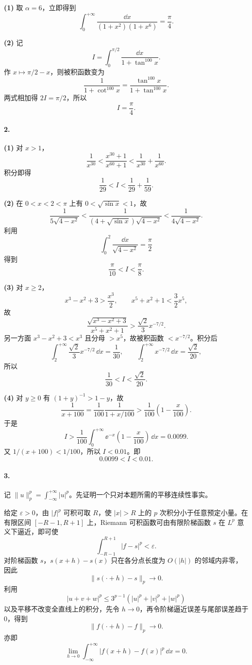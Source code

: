 \textbf{(1)} 取 $\alpha=6$，立即得到
\[
  \boxed{\int_0^{+\infty}\frac{\dd x}{(1+x^2)(1+x^6)}=\frac\pi4}.
\]

\textbf{(2)} 记
\[
  I=\int_0^{\pi/2}\frac{\dd x}{1+\tan^{100}x}.
\]
作 $x\mapsto\pi/2-x$，则被积函数变为
\[
  \frac1{1+\cot^{100}x}=\frac{\tan^{100}x}{1+\tan^{100}x}.
\]
两式相加得 $2I=\pi/2$，所以
\[
  \boxed{I=\frac\pi4}.
\]

\paragraph{2.}
\textbf{(1)} 对 $x>1$，
\[
  \frac1{x^{30}}<\frac{x^{30}+1}{x^{60}+1}
  <\frac1{x^{30}}+\frac1{x^{60}}.
\]
积分即得
\[
  \boxed{\frac1{29}<I<\frac1{29}+\frac1{59}}.
\]

\textbf{(2)} 在 $0<x<2<\pi$ 上有 $0<\sqrt{\sin x}<1$，故
\[
  \frac1{5\sqrt{4-x^2}}
  <\frac1{(4+\sqrt{\sin x})\sqrt{4-x^2}}
  <\frac1{4\sqrt{4-x^2}}.
\]
利用
\[
  \int_0^2\frac{\dd x}{\sqrt{4-x^2}}=\frac\pi2
\]
得到
\[
  \boxed{\frac\pi{10}<I<\frac\pi8}.
\]

\textbf{(3)} 对 $x\geq2$，
\[
  x^3-x^2+3>\frac{x^3}{2},
  \qquad
  x^5+x^2+1<\frac32x^5,
\]
故
\[
  \frac{\sqrt{x^3-x^2+3}}{x^5+x^2+1}
  >\frac{\sqrt2}{3}x^{-7/2}.
\]
另一方面 $x^3-x^2+3<x^3$ 且分母 $>x^5$，故被积函数 $<x^{-7/2}$。积分后
\[
  \int_2^{+\infty}\frac{\sqrt2}{3}x^{-7/2}\,\dd x=\frac1{30},
  \qquad
  \int_2^{+\infty}x^{-7/2}\,\dd x=\frac{\sqrt2}{20},
\]
所以
\[
  \boxed{\frac1{30}<I<\frac{\sqrt2}{20}}.
\]

\textbf{(4)} 对 $y\geq0$ 有 $(1+y)^{-1}>1-y$，故
\[
  \frac1{x+100}=\frac1{100}\frac1{1+x/100}
  >\frac1{100}\left(1-\frac{x}{100}\right).
\]
于是
\[
  I>\frac1{100}\int_0^{+\infty}\ee^{-x}\left(1-\frac{x}{100}\right)\,\dd x
  =0.0099.
\]
又 $1/(x+100)<1/100$，所以 $I<0.01$。即
\[
  \boxed{0.0099<I<0.01}.
\]

\paragraph{3.}
记 $\|u\|_p^p=\int_{-\infty}^{+\infty}|u|^p$。先证明一个只对本题所需的平移连续性事实。

给定 $\varepsilon>0$，由 $|f|^p$ 可积可取 $R$，使 $|x|>R$ 上的 $p$ 次积分小于任意预定小量。在有限区间 $[-R-1,R+1]$ 上，Riemann 可积函数可由有限阶梯函数 $s$ 在 $L^p$ 意义下逼近，即可使
\[
  \int_{-R-1}^{R+1}|f-s|^p<\varepsilon.
\]
对阶梯函数 $s$，$s(x+h)-s(x)$ 只在各分点长度为 $O(|h|)$ 的邻域内非零，因此
\[
  \|s(\cdot+h)-s\|_p\to0.
\]
利用
\[
  |u+v+w|^p\leq3^{p-1}(|u|^p+|v|^p+|w|^p)
\]
以及平移不改变全直线上的积分，先令 $h\to0$，再令阶梯逼近误差与尾部误差趋于 $0$，得到
\[
  \|f(\cdot+h)-f\|_p\to0.
\]
亦即
\[
  \boxed{\lim_{h\to0}\int_{-\infty}^{+\infty}|f(x+h)-f(x)|^p\,\dd x=0}.
\]

